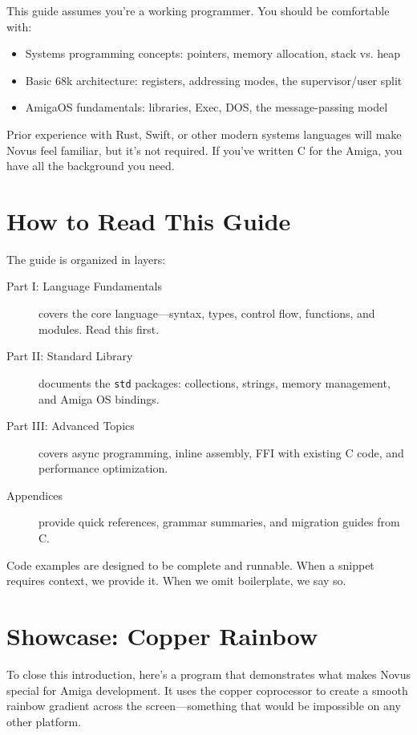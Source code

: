 This guide assumes you're a working programmer. You should be comfortable with:

\begin{itemize}
    \item Systems programming concepts: pointers, memory allocation, stack vs. heap
    \item Basic 68k architecture: registers, addressing modes, the supervisor/user split
    \item AmigaOS fundamentals: libraries, Exec, DOS, the message-passing model
\end{itemize}

Prior experience with Rust, Swift, or other modern systems languages will make Novus feel familiar, but it's not required. If you've written C for the Amiga, you have all the background you need.

\section{How to Read This Guide}

The guide is organized in layers:

\begin{description}
    \item[Part I: Language Fundamentals] covers the core language---syntax, types, control flow, functions, and modules. Read this first.

    \item[Part II: Standard Library] documents the \texttt{std} packages: collections, strings, memory management, and Amiga OS bindings.

    \item[Part III: Advanced Topics] covers async programming, inline assembly, FFI with existing C code, and performance optimization.

    \item[Appendices] provide quick references, grammar summaries, and migration guides from C.
\end{description}

Code examples are designed to be complete and runnable. When a snippet requires context, we provide it. When we omit boilerplate, we say so.

\section{Showcase: Copper Rainbow}

To close this introduction, here's a program that demonstrates what makes Novus special for Amiga development. It uses the copper coprocessor to create a smooth rainbow gradient across the screen---something that would be impossible on any other platform.

